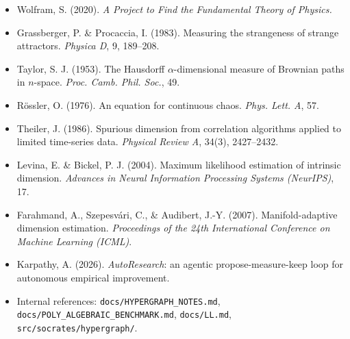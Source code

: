 \documentclass[11pt,a4paper]{article}
\begin{document}
\begin{itemize}
\item[] Wolfram, S. (2020). \emph{A Project to Find the Fundamental Theory of Physics.}
\item[] Grassberger, P. \& Procaccia, I. (1983). Measuring the strangeness of
  strange attractors. \emph{Physica D}, 9, 189--208.
\item[] Taylor, S. J. (1953). The Hausdorff $\alpha$-dimensional measure of
  Brownian paths in $n$-space. \emph{Proc. Camb. Phil. Soc.}, 49.
\item[] R\"ossler, O. (1976). An equation for continuous chaos.
  \emph{Phys. Lett. A}, 57.
\item[] Theiler, J. (1986). Spurious dimension from correlation algorithms
  applied to limited time-series data. \emph{Physical Review A}, 34(3),
  2427--2432.
\item[] Levina, E. \& Bickel, P. J. (2004). Maximum likelihood estimation
  of intrinsic dimension. \emph{Advances in Neural Information Processing
  Systems (NeurIPS)}, 17.
\item[] Farahmand, A., Szepesv\'ari, C., \& Audibert, J.-Y. (2007).
  Manifold-adaptive dimension estimation. \emph{Proceedings of the 24th
  International Conference on Machine Learning (ICML)}.
\item[] Karpathy, A. (2026). \emph{AutoResearch}: an agentic
  propose-measure-keep loop for autonomous empirical improvement.
\item[] Internal references: \texttt{docs/HYPERGRAPH\_NOTES.md},
  \texttt{docs/POLY\_ALGEBRAIC\_BENCHMARK.md}, \texttt{docs/LL.md},
  \texttt{src/socrates/hypergraph/}.
\end{itemize}
\end{document}
